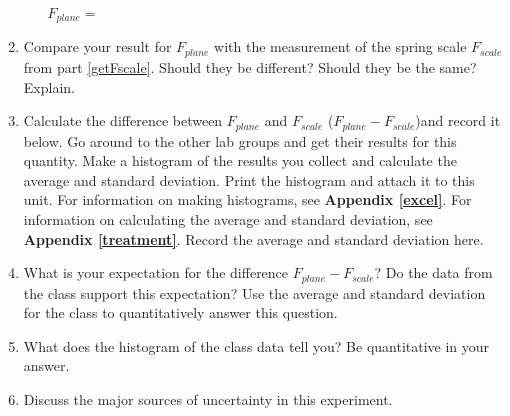 \begin{enumerate}
\begin{enumerate}
\( F_{plane} =\)  \vspace{30mm}

\end{enumerate}

\item Compare your result for \( F_{plane} \) with the measurement of the spring
scale \( F_{scale} \) from part \ref{getFscale}. Should they be different? Should they be the same? Explain.
\vspace{30mm}


\item Calculate the difference between \( F_{plane} \) and \( F_{scale} \) (\( F_{plane} - F_{scale} \))and record it below.
Go around to the other lab groups and get their results for this quantity.
Make a histogram of the results you collect and calculate the average and standard deviation.
Print the histogram and attach it to this unit.
For information on making histograms, see \textbf{Appendix \ref{excel}}. For information on calculating the average and
standard deviation, see \textbf{Appendix \ref{treatment}}. Record the average and standard deviation here.
\vspace{30mm}


\item What is your expectation for the difference \( F_{plane} - F_{scale} \)?
Do the data from the class support this expectation? 
Use the average and standard deviation for the class to quantitatively answer this question.
\vspace{15mm}

\item What does the histogram of the class data tell you? Be quantitative in your answer.
\vspace{15mm}

\item Discuss the major sources of uncertainty in this experiment.
\vspace{15mm}

\end{enumerate}
